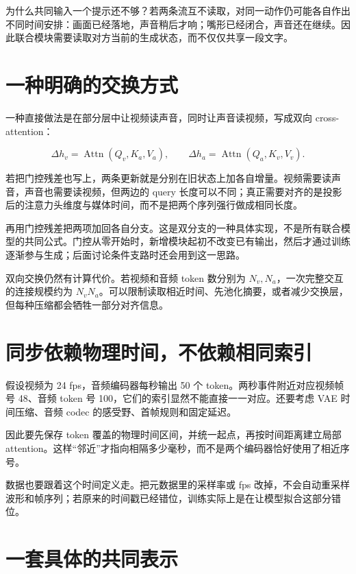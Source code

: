 为什么共同输入一个提示还不够？若两条流互不读取，对同一动作仍可能各自作出不同时间安排：画面已经落地，声音稍后才响；嘴形已经闭合，声音还在继续。因此联合模块需要读取对方当前的生成状态，而不仅仅共享一段文字。

\section{一种明确的交换方式}\label{seedance-m05-ux4e00ux79cdux660eux786eux7684ux4ea4ux6362ux65b9ux5f0f}

一种直接做法是在部分层中让视频读声音，同时让声音读视频，写成双向 cross-attention：

\[
\Delta h_v=\operatorname{Attn}(Q_v,K_a,V_a),
\qquad
\Delta h_a=\operatorname{Attn}(Q_a,K_v,V_v).
\]

若把门控残差也写上，两条更新就是分别在旧状态上加各自增量。视频需要读声音，声音也需要读视频，但两边的 query 长度可以不同；真正需要对齐的是投影后的注意力头维度与媒体时间，而不是把两个序列强行做成相同长度。

再用门控残差把两项加回各自分支。这是双分支的一种具体实现，不是所有联合模型的共同公式。门控从零开始时，新增模块起初不改变已有输出，然后才通过训练逐渐参与生成；后面讨论条件支路时还会用到这一思路。

双向交换仍然有计算代价。若视频和音频 token 数分别为 \(N_v,N_a\)，一次完整交互的连接规模约为 \(N_vN_a\)。可以限制读取相近时间、先池化摘要，或者减少交换层，但每种压缩都会牺牲一部分对齐信息。

\section{同步依赖物理时间，不依赖相同索引}\label{seedance-m05-ux540cux6b65ux4f9dux8d56ux7269ux7406ux65f6ux95f4ux4e0dux4f9dux8d56ux76f8ux540cux7d22ux5f15}

假设视频为 24 fps，音频编码器每秒输出 50 个 token。两秒事件附近对应视频帧号 48、音频 token 号 100，它们的索引显然不能直接一一对应。还要考虑 VAE 时间压缩、音频 codec 的感受野、首帧规则和固定延迟。

因此要先保存 token 覆盖的物理时间区间，并统一起点，再按时间距离建立局部 attention。这样“邻近”才指向相隔多少毫秒，而不是两个编码器恰好使用了相近序号。

数据也要跟着这个时间定义走。把元数据里的采样率或 fps 改掉，不会自动重采样波形和帧序列；若原来的时间戳已经错位，训练实际上是在让模型拟合这部分错位。

\section{一套具体的共同表示}\label{seedance-m05-ux4e00ux5957ux5177ux4f53ux7684ux5171ux540cux8868ux793a}

